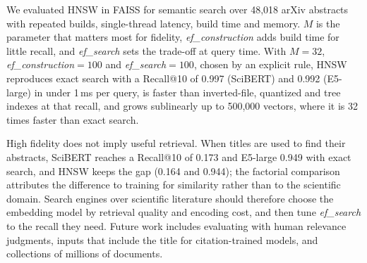 \documentclass[runningheads]{llncs}
\newcommand{\efc}{\textit{ef\_construction}}
\newcommand{\efs}{\textit{ef\_search}}
\begin{document}
We evaluated HNSW in FAISS for semantic search over 48,018 arXiv abstracts with repeated
builds, single-thread latency, build time and memory. $M$ is the parameter that matters most
for fidelity, \efc{} adds build time for little recall, and \efs{} sets the trade-off at query
time. With $M=32$, \efc{}$=100$ and \efs{}$=100$, chosen by an explicit rule, HNSW reproduces
exact search with a Recall@10 of 0.997 (SciBERT) and 0.992 (E5-large) in under 1\,ms per query,
is faster than inverted-file, quantized and tree indexes at that recall, and grows sublinearly
up to 500,000 vectors, where it is 32 times faster than exact search.

High fidelity does not imply useful retrieval. When titles are used to find their abstracts,
SciBERT reaches a Recall@10 of 0.173 and E5-large 0.949 with exact search, and HNSW keeps the
gap (0.164 and 0.944); the factorial
comparison attributes the difference to training for similarity rather than to the
scientific domain. Search engines over scientific literature should therefore choose the
embedding model by retrieval quality and encoding cost, and then tune \efs{} to the recall
they need. Future work includes evaluating with human relevance judgments, inputs that
include the title for citation-trained models, and collections of millions of documents.

\end{document}
